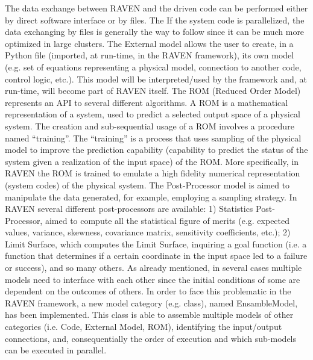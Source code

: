 The data exchange between RAVEN and the driven code can be performed either by direct software interface or by files.
The
If the system code is parallelized, the data exchanging by files is generally the way to follow since it can be much more optimized in large clusters.
The External model allows the user to create, in a Python file (imported, at run-time, in the RAVEN framework), its own model (e.g. set of equations representing a 
physical model, connection to another code, control logic, etc.). This model will be interpreted/used by the framework and, at run-time, will become part of RAVEN 
itself.
The ROM (Reduced Order Model) represents an API to several different algorithms. A ROM is a mathematical representation of a system, used to predict a selected 
output space of a physical system. The creation and sub-sequential usage of a ROM involves a procedure named ``training''. The ``training'' is a process that uses 
sampling of the physical model to improve the prediction capability (capability to predict the status of the system given a realization of the input space) of the ROM. 
More specifically, in RAVEN the ROM is trained to emulate a high fidelity numerical representation (system codes) of the physical system.
The Post-Processor model is aimed to manipulate the data generated, for example, employing a sampling strategy. In RAVEN several different post-processors are 
available: 1) Statistics Post-Processor, aimed to compute all the statistical figure of merits (e.g. expected values, variance, skewness, covariance matrix, sensitivity 
coefficients, etc.); 2) Limit Surface, which computes the Limit Surface, inquiring a goal function (i.e. a function that determines if a certain coordinate in the input space 
led to a failure or success), and so many others.
As already mentioned, in several cases multiple models need to interface with each other since the initial conditions of some are dependent on the outcomes of others. 
In order to face this problematic in the RAVEN framework, a new model category (e.g. class), named EnsambleModel, has been implemented. This class is able to 
assemble multiple models of other categories (i.e. Code, External Model, ROM), identifying the input/output connections, and, consequentially the order of execution 
and which sub-models can be executed in parallel.
